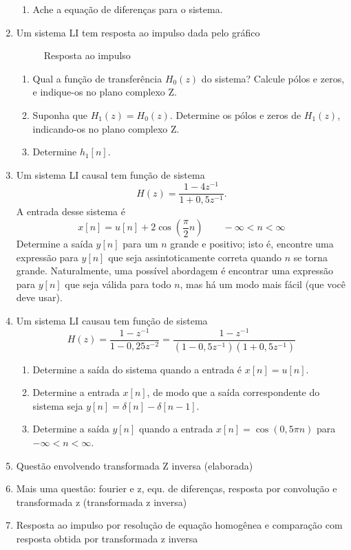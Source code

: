 \documentclass[a4paper,10pt]{article}
\begin{document}
\begin{enumerate}
\begin{enumerate}
			\item Ache a equação de diferenças para o sistema.
		\end{enumerate}
	\item Um sistema LI tem resposta ao impulso dada pelo gráfico
		\begin{figure*}
			\centering
			\label{fig:h0}
			\caption{Resposta ao impulso}
		\end{figure*}
		\begin{enumerate}
			\item Qual a função de transferência $H_0(z)$ do sistema? Calcule pólos e zeros, e indique-os no plano complexo Z.
			\item Suponha que $H_1(z) = H_0(z)$. Determine os pólos e zeros de $H_1(z)$, indicando-os no plano complexo Z.
			\item Determine $h_1[n]$.
	        \end{enumerate}
	\item Um sistema LI causal tem função de sistema
		\begin{equation*}
			H(z) = \frac{1-4z^{-1}}{1+0,5z^{-1}}.
		\end{equation*}
		A entrada desse sistema é
		\begin{equation*}
			x[n] = u[n] + 2\cos\left (\frac{\pi}{2}n\right )\qquad -\infty< n < \infty
		\end{equation*}
		Determine a saída $y[n]$ para um $n$ grande e positivo; isto é, encontre uma expressão para $y[n]$ que seja assintoticamente correta quando $n$ se torna grande. Naturalmente, uma possível abordagem é encontrar uma expressão para $y[n]$ que seja válida para todo $n$, mas há um modo mais fácil (que você deve usar).
	
	\item Um sistema LI causau tem função de sistema
		\begin{equation*}
			H(z) = \frac{1-z^{-1}}{1-0,25z^{-2}} = \frac{1-z^{-1}}{(1-0,5z^{-1})(1+0,5z^{-1})}
		\end{equation*}
		\begin{enumerate}
			\item Determine a saída do sistema quando a entrada é $x[n]=u[n]$.
			\item Determine a entrada $x[n]$, de modo que a saída correspondente do sistema seja $y[n]=\delta[n] - \delta[n-1]$.
			\item Determine a saída $y[n]$ quando a entrada $x[n] = \cos(0,5\pi n)$ para $-\infty < n< \infty$.
		\end{enumerate}

	\item Questão envolvendo transformada Z inversa (elaborada)
	\item Mais uma questão: fourier e z, equ. de diferenças, resposta por convolução e transformada z (transformada z inversa)
	\item Resposta ao impulso por resolução de equação homogênea e comparação com resposta obtida por transformada z inversa
\end{enumerate}
\end{document}

